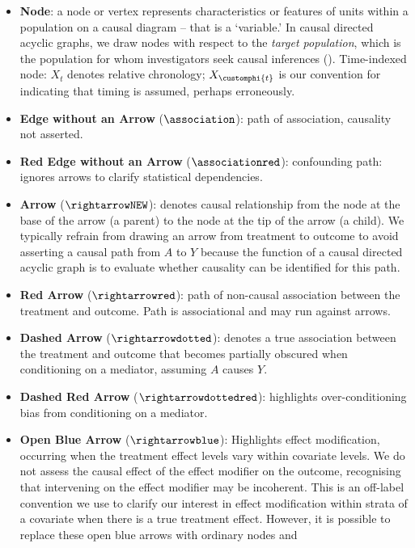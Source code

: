 \documentclass[
  single column]{article}
\begin{document}
\begin{itemize}
\item
  \textbf{Node}: a node or vertex represents characteristics or features
  of units within a population on a causal diagram -- that is a
  `variable.' In causal directed acyclic graphs, we draw nodes with
  respect to the \emph{target population}, which is the population for
  whom investigators seek causal inferences
  (). Time-indexed
  node: \(X_t\) denotes relative chronology; \(X_{\customphi{t}}\) is
  our convention for indicating that timing is assumed, perhaps
  erroneously.
\item
  \textbf{Edge without an Arrow} (\(\association\)): path of
  association, causality not asserted.
\item
  \textbf{Red Edge without an Arrow} (\(\associationred\)): confounding
  path: ignores arrows to clarify statistical dependencies.
\item
  \textbf{Arrow} (\(\rightarrowNEW\)): denotes causal relationship from
  the node at the base of the arrow (a parent) to the node at the tip of
  the arrow (a child). We typically refrain from drawing an arrow from
  treatment to outcome to avoid asserting a causal path from \(A\) to
  \(Y\) because the function of a causal directed acyclic graph is to
  evaluate whether causality can be identified for this path.
\item
  \textbf{Red Arrow} (\(\rightarrowred\)): path of non-causal
  association between the treatment and outcome. Path is associational
  and may run against arrows.
\item
  \textbf{Dashed Arrow} (\(\rightarrowdotted\)): denotes a true
  association between the treatment and outcome that becomes partially
  obscured when conditioning on a mediator, assuming \(A\) causes \(Y\).
\item
  \textbf{Dashed Red Arrow} (\(\rightarrowdottedred\)): highlights
  over-conditioning bias from conditioning on a mediator.
\item
  \textbf{Open Blue Arrow} (\(\rightarrowblue\)): Highlights effect
  modification, occurring when the treatment effect levels vary within
  covariate levels. We do not assess the causal effect of the effect
  modifier on the outcome, recognising that intervening on the effect
  modifier may be incoherent. This is an off-label convention we use to
  clarify our interest in effect modification within strata of a
  covariate when there is a true treatment effect. However, it is
  possible to replace these open blue arrows with ordinary nodes and

\end{itemize}
\end{document}
